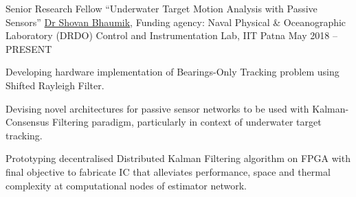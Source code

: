 
\begin{cvexperience}

\cvposition
	{Senior Research Fellow} %
	{``Underwater Target Motion Analysis with Passive Sensors''} %
	{\href{http://www.tutorialpoint.org/ShovanBhaumik/index.html}{Dr Shovan Bhaumik}, Funding agency: Naval Physical \& Oceanographic Laboratory (DRDO)} %
	{Control and Instrumentation Lab, IIT Patna} %
	{May 2018 -- PRESENT} %
	{\begin{cvitems} %
		\item {Developing hardware implementation of Bearings-Only Tracking problem using Shifted Rayleigh Filter.}
		\item {Devising novel architectures for passive sensor networks to be used with Kalman-Consensus Filtering paradigm, particularly in context of underwater target tracking.}
		\item {Prototyping decentralised Distributed Kalman Filtering algorithm on FPGA with final objective to fabricate IC that alleviates performance, space and thermal complexity at computational nodes of estimator network.}
	\end{cvitems}}


\end{cvexperience}

